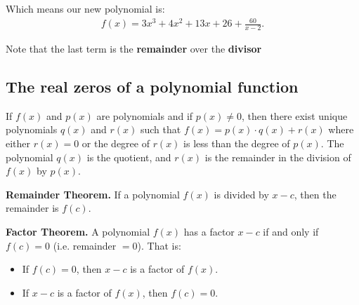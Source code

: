 \documentclass{report}
\begin{document}
    \bigbreak \noindent 
    Which means our new polynomial is:
    \begin{align*}
      f(x) = 3x^{3} + 4x^{2} +13x + 26 + \frac{60}{x-2}
    .\end{align*}

    \bigbreak \noindent 
    Note that the last term is the \textbf{remainder} over the \textbf{divisor}

    \pagebreak \bigbreak \noindent
    \subsection{The real zeros of a polynomial function}
    If $f(x)$ and $p(x)$ are polynomials and if $p(x) \neq 0$, then there exist unique polynomials $q(x)$ and $r(x)$ such that
    $f(x)=p(x)\cdot q(x)+r(x)$ where either $r(x) = 0$ or the degree of $r(x)$ is less than the degree of $p(x)$. The polynomial $q(x)$ is the quotient, and $r(x)$ is the remainder in the division of $f(x)$ by $p(x)$.

    \bigbreak \noindent 
    \begin{mdframed}
    \textbf{Remainder Theorem.} 
    \bigbreak \noindent 
    If a polynomial $f(x)$ is divided by $x-c$, then the remainder is $f(c)$.
    \end{mdframed}

    \bigbreak \noindent 
    \begin{mdframed}
    \textbf{Factor Theorem.}
    \bigbreak \noindent 
    A polynomial $f(x)$ has a factor $x-c$ if and only if $f(c) = 0$ (i.e. remainder $= 0$). That is:
    \begin{itemize}
    \item If $f(c) = 0$, then $x-c$ is a factor of $f(x)$.
    \item If $x-c$ is a factor of $f(x)$, then $f(c) = 0$.
    \end{itemize}
    \end{mdframed}

    \bigbreak \noindent 
\end{document}
